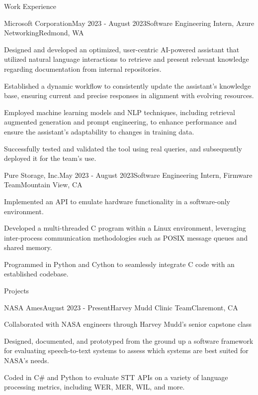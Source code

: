 \documentclass[
	11pt, %
]{resume} %
\begin{document}
\begin{rSection}{Work Experience}
\begin{rSubsection}{Microsoft Corporation}{May 2023 - August 2023}{Software Engineering Intern, Azure Networking}{Redmond, WA}
		\item Designed and developed an optimized, user-centric AI-powered assistant that utilized natural language interactions to retrieve and present relevant knowledge regarding documentation from internal repositories.
        \item Established a dynamic workflow to consistently update the assistant’s knowledge base, ensuring current and precise responses in alignment with evolving resources.  
        \item Employed machine learning models and NLP techniques, including retrieval augmented generation and prompt engineering, to enhance performance and ensure the assistant’s adaptability to changes in training data. 
        \item Successfully tested and validated the tool using real queries, and subsequently deployed it for the team’s use.
	\end{rSubsection}
 \begin{rSubsection}{Pure Storage, Inc.}{May 2023 - August 2023}{Software Engineering Intern, Firmware Team}{Mountain View, CA}
		\item Implemented an API to emulate hardware functionality in a software-only environment. 
        \item Developed a multi-threaded C program within a Linux environment, leveraging inter-process communication methodologies such as POSIX message queues and shared memory. 
        \item Programmed in Python and Cython to seamlessly integrate C code with an established codebase.

	\end{rSubsection}
\end{rSection}

\begin{rSection} {Projects}
    \begin{rSubsection}{NASA Ames}{August 2023 - Present}{Harvey Mudd Clinic Team}{Claremont, CA}
        \item Collaborated with NASA engineers through Harvey Mudd’s senior capstone class
        \item Designed, documented, and prototyped from the ground up a software framework for evaluating speech-to-text systems to assess which systems are best suited for NASA’s needs. 
        \item Coded in C\# and Python to evaluate STT APIs on a variety of language processing metrics, including WER, MER, WIL, and more.
    \end{rSubsection}    
\end{rSection}
\end{document}
